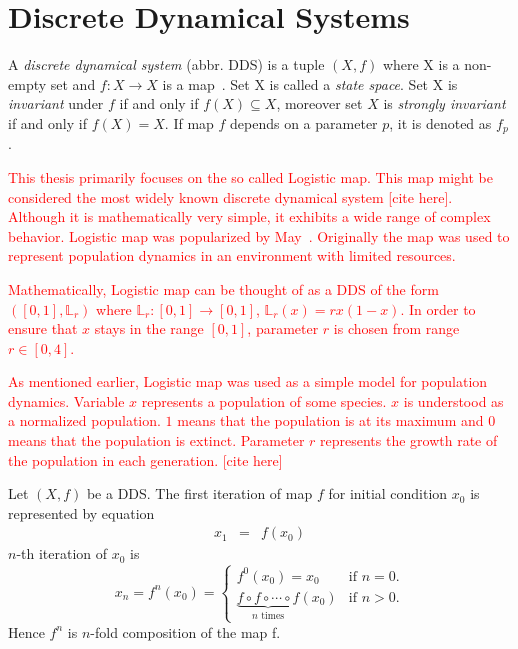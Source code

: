 \section{Discrete Dynamical Systems}

\begin{definition}
    A \emph{discrete dynamical system} (abbr. DDS) is a tuple $\left( X, f \right)$ where X is a non-empty set and $f: X \rightarrow X$ is a map~\cite{Brin20100706}.
    Set X is called a \emph{state space}.
    Set X is \emph{invariant} under $f$ if and only if $f(X) \subseteq X$, moreover set $X$ is \emph{strongly invariant} if and only if $f(X) = X$.
    If map $f$ depends on a parameter $p$, it is denoted as $f_p$.
\end{definition}

\begin{remark}
    \textcolor{red}{
    This thesis primarily focuses on the so called Logistic map.
    This map might be considered the most widely known discrete dynamical system [cite here].
    Although it is mathematically very simple, it exhibits a wide range of complex behavior.
    Logistic map was popularized by May~\cite{May19760610}.
    Originally the map was used to represent population dynamics in an environment with limited resources.
    }
    \par
    \textcolor{red}{
    Mathematically, Logistic map can be thought of as a DDS of the form $\left( [0, 1], \mathbb{L}_{r} \right)$ where $\mathbb{L}_{r}: [0,1] \rightarrow [0,1]$, $\mathbb{L}_{r}(x) = rx(1-x)$.
    In order to ensure that $x$ stays in the range $[0,1]$, parameter $r$ is chosen from range $r \in [0, 4]$.
    }
    \par
    \textcolor{red}{
    As mentioned earlier, Logistic map was used as a simple model for population dynamics.
    Variable $x$ represents a population of some species.
    $x$ is understood as a normalized population.
    $1$ means that the population is at its maximum and $0$ means that the population is extinct.
    Parameter $r$ represents the growth rate of the population in each generation. [cite here]
    }
\end{remark}

\begin{definition}
    Let $\left( X, f \right)$ be a DDS. 
    The first iteration of map $f$ for initial condition $x_0$ is represented by equation
    \begin{eqnarray}
        x_{1}  & = & f(x_{0})
    \end{eqnarray}
    $n$-th iteration of $x_0$ is
    \begin{equation}
    x_{n} = f^{n}(x_0) =
        \begin{cases}
            f^{0}(x_0) = x_0 & \text{if } n = 0. \\
            \underbrace{f \circ f \circ \cdots \circ f}_\text{$n$ times}(x_0) & \text{if } n > 0. 
        \end{cases}
    \end{equation}
    Hence $f^{n}$ is $n$-fold composition of the map f.
\end{definition}

